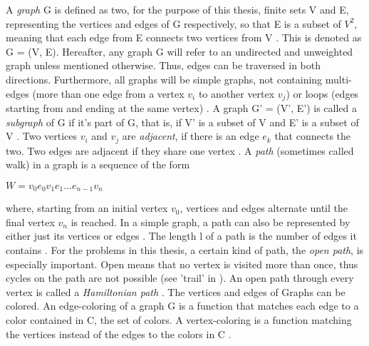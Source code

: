 \documentclass[12pt,a4paper]{article}
\begin{document}
A \textit{graph} G is defined as two, for the purpose of this thesis, finite sets V and E, representing the vertices and edges of G respectively, so that E is a subset of $ V ^ 2$, meaning that each edge from E connects two vertices from V \citep[p. 1]{Bollobas1998}. This is denoted as G = (V, E). Hereafter, any graph G will refer to an undirected and unweighted graph unless mentioned otherwise. Thus, edges can be traversed in both directions. Furthermore, all graphs will be simple graphs, not containing multi-edges (more than one edge from a vertex $v_i$ to another vertex $v_j$) or loops (edges starting from and ending at the same vertex) \citep[pp. 3-4]{Gross2013}. 
\newline
\newline
A graph G' = (V', E') is called a \textit{subgraph} of G if it's part of G, that is, if V' is a subset of V and E' is a subset of V \citep[p. 2]{Bollobas1998}.
\newline
\newline
Two vertices $v_i$ and $v_j$ are \textit{adjacent}, if there is an edge $e_k$ that connects the two. Two edges are adjacent if they share one vertex \citep[p. 1-2]{Bollobas1998}. 
\newline
\newline
A \textit{path} (sometimes called walk) in a graph is a sequence of the form 
\begin{center}
	$ W = v_0 e_0 v_1 e_1...e_{n-1} v_n $
\end{center}
where, starting from an initial vertex $v_0$, vertices and edges alternate until the final vertex $v_n$ is reached. In a simple graph, a path can also be represented by either just its vertices \citep[p. 10]{Gross2013} or edges \citep[p. 4]{Bollobas1998}. The length l of a path is the number of edges it contains \citep[p. 5]{Bollobas1998}.
\newline
\newline
For the problems in this thesis, a certain kind of path, the \textit{open path}, is especially important. Open means that no vertex is visited more than once, thus cycles on the path are not possible (see 'trail' in \citep[p. 10]{Gross2013}). An open path through every vertex is called a \textit{Hamiltonian path} \citep[p. 14]{Bollobas1998}.
\newline
\newline
The vertices and edges of Graphs can be colored. An edge-coloring of a graph G is a function that matches each edge to a color contained in C, the set of colors.  A vertex-coloring is a function matching the vertices instead of the edges to the colors in C \citep[pp. 7-8]{Gross2013}. 
\end{document}

